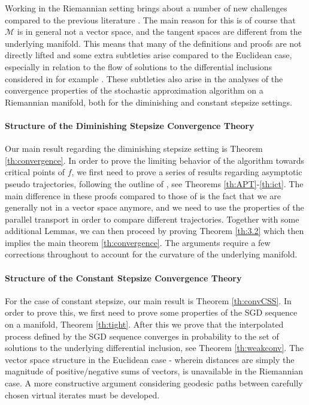 \documentclass{article}
\newcommand{\CM}{\mathcal{M}}
\begin{document}
Working in the Riemannian setting brings about a number of new challenges compared to the previous literature \cite{davis2020stochastic, bolte2021conservative, bianchi2022convergence}. The main reason for this is of course that $\CM$ is in general not a vector space, and the tangent spaces are different from the underlying manifold. This means that many of the definitions and proofs are not directly lifted and some extra subtleties arise compared to the Euclidean case, especially in relation to the flow of solutions to the differential inclusions considered in for example \cite{bianchi2022convergence}. These subtleties also arise in the analyses of the convergence properties of the stochastic approximation algorithm on a Riemannian manifold, both for the diminishing and constant stepsize settings. 


\paragraph{Structure of the Diminishing Stepsize Convergence Theory} 

Our main result regarding the diminishing stepsize setting is Theorem \ref{th:convergence}. In order to prove the limiting behavior of the algorithm towards critical points of $f$, we first need to prove a series of results regarding asymptotic pseudo trajectories, following the outline of \cite{benaim2005stochastic}, see Theorems \ref{th:APT}-\ref{th:ict}. The main difference in these proofs compared to those of \cite{benaim2005stochastic} is the fact that we are generally not in a vector space anymore, and we need to use the properties of the parallel transport in order to compare different trajectories. Together with some additional Lemmas, we can then proceed by proving Theorem \ref{th:3.2} which then implies the main theorem \ref{th:convergence}. The arguments require a few corrections throughout to account for the curvature of the underlying manifold. 

\paragraph{Structure of the Constant Stepsize Convergence Theory} 
For the case of constant stepsize, our main result is Theorem \ref{th:convCSS}. In order to prove this, we first need to prove some properties of the SGD sequence on a manifold, Theorem \ref{th:tight}. After this we prove that the interpolated process defined by the SGD sequence converges in probability to the set of solutions to the underlying differential inclusion, see Theorem \ref{th:weakconv}. The vector space structure in the Euclidean case - wherein distances are simply the magnitude of positive/negative sums of vectors, is unavailable in the Riemannian case. A more constructive argument considering geodesic paths between carefully chosen virtual iterates must be developed.
\end{document}

